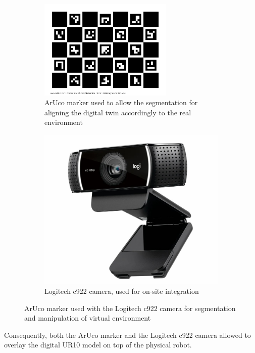 \begin{figure}[h]
    \centering
    \begin{subfigure}[b]{0.45\textwidth}
    \centering
    \includegraphics[width=0.7\textwidth]{figs/calib_io_charuco_200x150_5x7_25_18_DICT_4X4.png}
    \caption{ArUco marker used to allow the segmentation for aligning the digital twin accordingly to the real environment}
    \label{f:aruco_marker}
    \end{subfigure}
        \hfill %
    \begin{subfigure}[b]{0.45\textwidth}
        \centering
        \includegraphics[width=0.7\linewidth]{figs/camera-c922.jpg}
        \caption{Logitech c922 camera, used for on-site integration}
        \label{fig:camera-c922}
    \end{subfigure}
    \caption{ArUco marker used with the Logitech c922 camera for segmentation and manipulation of virtual environment}
\label{marker-camera}
\end{figure}

Consequently, both the ArUco marker and the Logitech c922 camera allowed to overlay the digital UR10 model on top of the physical robot.

